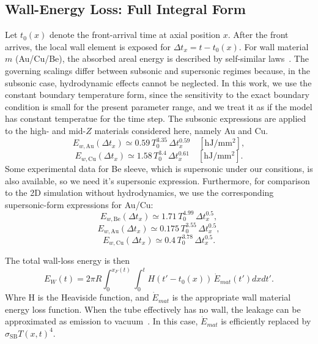 \documentclass[11pt]{article}
\begin{document}
\subsection{Wall-Energy Loss: Full Integral Form}
Let $t_0(x)$ denote the front-arrival time at axial position $x$. After the front arrives, the local wall element is exposed for $\Delta t_x=t-t_0(x)$. For wall material $m$ (Au/Cu/Be), the absorbed areal energy is described by self-similar laws~\cite{Shussman2015,Cohen2020Key}. The governing scalings differ between subsonic and supersonic regimes because, in the subsonic case, hydrodynamic effects cannot be neglected. In this work, we use the constant boundary temperature form, since the sensitivity to the exact boundary condition is small for the present parameter range, and we treat it as if the model has constant temperatue for the time step. The subsonic expressions are applied to the high- and mid-$Z$ materials considered here, namely Au and Cu.
\begin{equation}
E_{w,\mathrm{Au}}(\Delta t_x)\simeq0.59\,T_0^{3.35}\,\Delta t_x^{0.59}
\quad [\mathrm{hJ/mm^2}],
\label{eq:wall_Au_fit_appendix}
\end{equation}
\begin{equation}
E_{w,\mathrm{Cu}}(\Delta t_x)\simeq1.58\,T_0^{3.4}\,\Delta t_x^{0.61}
\quad [\mathrm{hJ/mm^2}].
\end{equation}
Some experimental data for Be sleeve, which is supersonic under our consitions, is also available, so we need it's supersonic expression. Furthermore, for comparison to the 2D simulation without hydrodynamics, we use the corresponding supersonic-form expressions for Au/Cu:
\begin{equation}
E_{w,\mathrm{Be}}(\Delta t_x)\simeq1.71\,T_0^{4.99}\,\Delta t_x^{0.5},
\end{equation}
\begin{equation}
E_{w,\mathrm{Au}}(\Delta t_x)\simeq0.175\,T_0^{3.55}\,\Delta t_x^{0.5},
\end{equation}
\begin{equation}
E_{w,\mathrm{Cu}}(\Delta t_x)\simeq0.4\,T_0^{3.78}\,\Delta t_x^{0.5}.
\end{equation}

The total wall-loss energy is then
\begin{equation}
E_W(t)=2\pi R\int_0^{x_F(t)}\int_{0}^{t}H(t'-t_0(x))\,\dot E_{mat}\!\left(t'\right)dxdt'.
\label{eq:EW_total_appendix}
\end{equation}
Whre H is the Heaviside function, and $\dot E_{mat}$ is the appropriate wall material energy loss function. When the tube effectively has no wall, the leakage can be approximated as emission to vacuum~\cite{Cohen2020Key}. In this case, $\dot E_{mat}$ is efficiently replaced by $\sigma_{\mathrm{SB}}T(x,t)^4$. 
\end{document}
